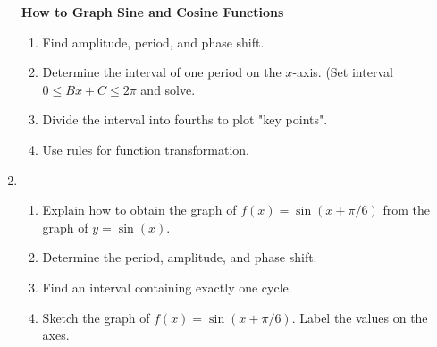 \begin{enumerate}
\textbf{How to Graph Sine and Cosine Functions}
\begin{enumerate}
\item Find amplitude, period, and phase shift.
\item Determine the interval of one period on the $x$-axis. (Set interval $0\leq Bx+C \leq 2\pi$ and solve.
\item Divide the interval into fourths to plot "key points".
\item Use rules for function transformation.
\end{enumerate}


\clearpage

\item \begin{enumerate} \item Explain how to obtain the graph of $f(x)=\sin(x+\pi/6)$ from the graph of $y=\sin(x)$. \\[.75in]

\item Determine the period, amplitude, and phase shift.\\[1.5in]

\item Find an interval containing exactly one cycle.\vfill

\item Sketch the graph of $f(x)=\sin(x+\pi/6)$. Label the values on the axes.

    \noindent

\end{enumerate} 



\end{enumerate}
